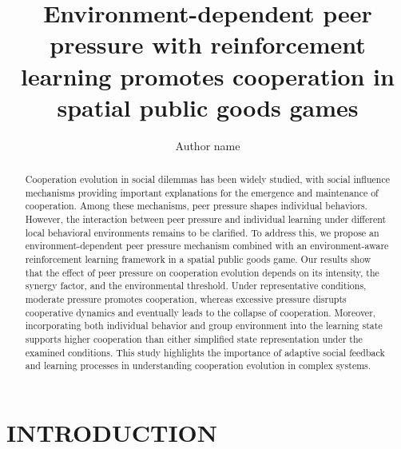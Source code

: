 \documentclass[%
  aip,
  amsmath,amssymb,
  reprint,
  showkeys,
]{revtex4-1}
\begin{document}
\title[]{Environment-dependent peer pressure with reinforcement learning promotes cooperation in spatial public goods games}




\author{Author name}

\begin{abstract}
Cooperation evolution in social dilemmas has been widely studied, with social influence mechanisms providing important explanations for the emergence and maintenance of cooperation. Among these mechanisms, peer pressure shapes individual behaviors. However, the interaction between peer pressure and individual learning under different local behavioral environments remains to be clarified. To address this, we propose an environment-dependent peer pressure mechanism combined with an environment-aware reinforcement learning framework in a spatial public goods game. Our results show that the effect of peer pressure on cooperation evolution depends on its intensity, the synergy factor, and the environmental threshold. Under representative conditions, moderate pressure promotes cooperation, whereas excessive pressure disrupts cooperative dynamics and eventually leads to the collapse of cooperation. Moreover, incorporating both individual behavior and group environment into the learning state supports higher cooperation than either simplified state representation under the examined conditions. This study highlights the importance of adaptive social feedback and learning processes in understanding cooperation evolution in complex systems.
\end{abstract}




\maketitle

\par

\section{\label{sec:level1}INTRODUCTION}
\end{document}
